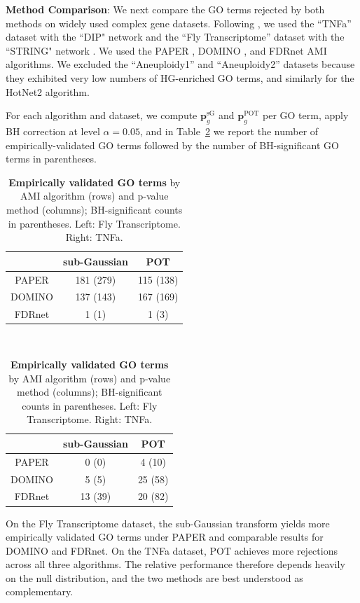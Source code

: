 \documentclass{article}
\theoremstyle{definition}
\newcommand{\1}{\mathbbm{1}}
\begin{document}
\noindent \textbf{Method Comparison}:
We next compare the GO terms rejected by both methods on widely used complex gene datasets. Following \cite{liu2025beyond}, we used the ``TNFa''  dataset \citep{schmidt2015acute} with the ``DIP" network  \citep{xenarios2000dip} and the ``Fly Transcriptome'' \citep{sun2024whole} dataset with the ``STRING" network \citep{szklarczyk2017string}. We  used the PAPER \citep{crane2024root}, DOMINO \citep{levi2021domino}, and FDRnet \citep{yang2021efficient} AMI algorithms. We excluded the ``Aneuploidy1'' and ``Aneuploidy2'' datasets because they exhibited very low numbers of HG-enriched GO terms, and similarly for the HotNet2 \citep{leiserson2015pan} algorithm.


For each algorithm and dataset, we compute $\mathbf{p}^{\mathrm{sG}}_g$ and $\mathbf{p}^{\mathrm{POT}}_g$ per GO term, apply BH correction at level $\alpha = 0.05$, and in Table~\ref{tab:ev-go-term} we report the number of empirically-validated GO terms followed by the number of BH-significant GO terms in parentheses. 


\begin{table}[h]
    \centering
    \begin{tabular}{ccc}
    \hline
        & sub-Gaussian & POT \\\hline
       PAPER & 181 (279) & 115 (138) \\\hline
       DOMINO & 137 (143) & 167 (169) \\\hline
       FDRnet & 1 (1) & 1 (3) \\\hline
    \end{tabular} $\quad$
    \begin{tabular}{ccc}
    \hline
        & sub-Gaussian & POT \\\hline
       PAPER & 0 (0) & 4 (10) \\\hline
       DOMINO & 5 (5) & 25 (58) \\\hline
       FDRnet & 13 (39) & 20 (82) \\\hline
    \end{tabular}
\caption{\textbf{Empirically validated GO terms} by AMI algorithm 
(rows) and p-value method (columns); BH-significant counts in 
parentheses. Left: Fly Transcriptome. Right: TNFa.}
    \label{tab:ev-go-term}
\end{table}

On the Fly Transcriptome dataset, the sub-Gaussian transform yields more empirically validated GO terms under PAPER and comparable results for DOMINO and FDRnet. On the TNFa dataset, POT achieves more rejections across all three algorithms. The relative performance therefore depends heavily on the null distribution, and the two methods are best understood as complementary.
\end{document}
